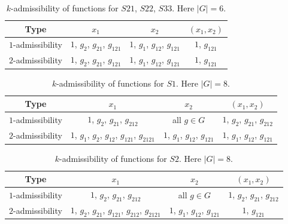 \begin{table}[H]
\caption{$k$-admissibility of functions for $S21$, $S22$, $S33$. Here $|G| = 6$.}
\label{tbl:Admissibility62}
\centering
\begin{tabular}{cccc}
\toprule
	Type & $x_1$  & $x_2$ & $(x_1,x_2)$ \\
\midrule
	$1$-admissibility & $1$, $ g_{2} $, $ g_{21} $, $ g_{121}$ & $1$, $ g_{1} $, $ g_{12} $, $ g_{121}$ & $1$, $ g_{121}$ \\
	$2$-admissibility & $1$, $ g_{2} $, $ g_{21} $, $ g_{121}$ & $1$, $ g_{1} $, $ g_{12} $, $ g_{121}$ & $1$, $ g_{121}$ \\
\bottomrule
\end{tabular}
\end{table}

\begin{table}[H]
\caption{$k$-admissibility of functions for $S1$. Here $|G| = 8$.}
\label{tbl:Admissibility81}
\centering
\begin{tabular}{cccc}
\toprule
	Type & $x_1$  & $x_2$ & $(x_1,x_2)$ \\
\midrule
	$1$-admissibility & $1$, $ g_{2} $, $ g_{21} $, $ g_{212}$ & all $g\in G$ & $1$, $ g_{2} $, $ g_{21} $, $ g_{212}$ \\
	$2$-admissibility & $1$, $ g_{1} $, $ g_{2} $, $ g_{12}$, $ g_{121}$, $ g_{2121}$ & $1$, $ g_{1} $, $ g_{12} $, $ g_{121}$ & $1$, $ g_{1} $, $ g_{12} $, $ g_{121}$ \\
\bottomrule
\end{tabular}
\end{table}

\begin{table}[H]
\caption{$k$-admissibility of functions for $S2$. Here $|G| = 8$.}
\label{tbl:Admissibility82}
\centering
\begin{tabular}{cccc}
\toprule
	Type & $x_1$  & $x_2$ & $(x_1,x_2)$ \\
\midrule
	$1$-admissibility & $1$, $ g_{2} $, $ g_{21} $, $ g_{212}$ & all $g\in G$ & $1$, $ g_{2} $, $ g_{21} $, $ g_{212}$ \\
	$2$-admissibility & $1$, $ g_{2} $, $ g_{21} $, $ g_{121}$, $ g_{212}$, $ g_{2121}$ & $1$, $ g_{1} $, $ g_{12} $, $ g_{121}$ & $1$, $ g_{121}$ \\
\bottomrule
\end{tabular}
\end{table}

